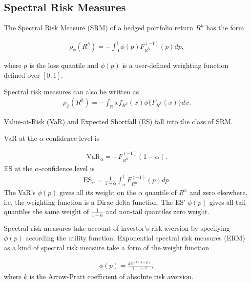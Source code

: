 \subsection{Spectral Risk Measures}\label{subsec:spectral-risk-measures}
The Spectral Risk Measure (SRM) of a hedged portfolio return $R^h$ has the form

\begin{align}
	\rho_\phi(R^h) = - \int_0^1 \phi(p) F_{R^h}^{(-1)}(p)d p,
	\end{align}

where $p$ is the loss quantile and $\phi(p)$ is a user-defined weighting function defined over $[0,1]$. \medskip


Spectral risk measures can also be written as
\begin{align}
	\rho_\phi(R^h) = - \int_\mathbb{R} x f_{R^h}(x) \phi\{F_{R^h}(x)\} d x.
	\end{align}

Value-at-Risk (VaR) and Expected Shortfall (ES) fall into the class of SRM. \medskip

VaR at the $\alpha$-confidence level is

\begin{align}
	\text{VaR}_\alpha = - F_{R^h}^{(-1)}(1-\alpha).
	\end{align}
ES at the $\alpha$-confidence level is 
\begin{align}
	\text{ES}_\alpha = \frac{1}{1-\alpha}\int_{\alpha}^{1} F_{R^h}^{(-1)}(p) d p.
	\end{align}
The VaR's $\phi(p)$ gives all its weight on the $\alpha$ quantile of $R^h$ and zero elsewhere,
i.e. the weighting function is a Dirac delta function.
The ES' $\phi(p)$ gives all tail quantiles the same weight of $\frac{1}{1-\alpha}$ and non-tail quantiles zero weight. \medskip

Spectral risk measures take account of investor's risk aversion by specifying $\phi(p)$ according the utility function.
Exponential spectral risk measures (ERM) as a kind of spectral risk measure take a form of the weight function

\begin{align}
	\phi(p) =\frac{k e^{-k(1-p)}}{1-e^{-k}} ,
	\end{align}
where $k$ is the Arrow-Pratt coefficient of absolute risk aversion. \medskip

